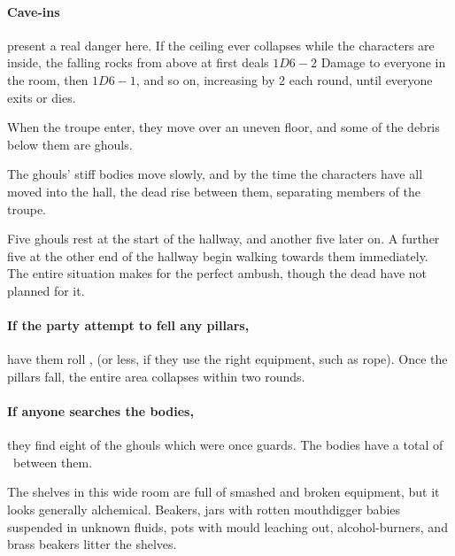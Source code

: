 \paragraph{Cave-ins} present a real danger here.  If the ceiling ever collapses while the characters are inside, the falling rocks from above at first deals $1D6-2$ Damage to everyone in the room, then $1D6-1$, and so on, increasing by 2 each round, until everyone exits or dies.


When the troupe enter, they move over an uneven floor, and some of the debris below them are ghouls.

The ghouls' stiff bodies move slowly, and by the time the characters have all moved into the hall, the dead rise between them, separating members of the troupe.

Five ghouls rest at the start of the hallway, and another five later on.
A further five at the other end of the hallway begin walking towards them immediately.
The entire situation makes for the perfect ambush, though the dead have not planned for it.

\paragraph{If the party attempt to fell any pillars,}
have them roll , \tn[13] (or less, if they use the right equipment, such as rope).
Once the pillars fall, the entire area collapses within two rounds.

\paragraph{If anyone searches the bodies,}
they find eight of the ghouls which were once \glspl{guard}.
The bodies have a total of \lootMedium\ between them.

\needspace{30em}


\begin{boxtext}
  The shelves in this wide room are full of smashed and broken equipment, but it looks generally alchemical.
  Beakers, jars with rotten mouthdigger babies suspended in unknown fluids, pots with mould leaching out, alcohol-burners, and brass beakers litter the shelves.
\end{boxtext}

